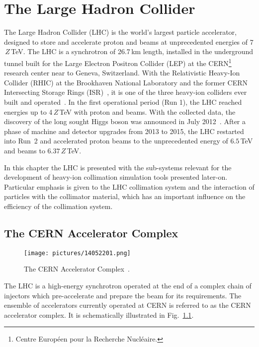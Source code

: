 \chapter{The Large Hadron Collider}\label{thelhc}
%
%
The Large Hadron Collider (\acrshort{LHC}) is the world's largest particle accelerator, designed to store and accelerate proton and \lead beams at unprecedented energies of 7$\,Z\,$TeV. The LHC is a synchrotron of 26.7\,km length, installed in the underground tunnel built for the Large Electron Positron Collider (LEP) at the CERN\footnote{Centre Europ\'{e}en pour la Recherche Nucl\'{e}aire.} research center near to Geneva, Switzerland. With the Relativistic Heavy-Ion Collider (RHIC) at the Brookhaven National Laboratory and the former CERN Intersecting Storage Rings (ISR)~\cite{ISRref}, it is one of the three heavy-ion colliders ever built and operated~\cite{Fischer2014}. In the first operational period (Run 1), the LHC reached energies up to 4$\,Z\,$TeV with proton and \lead beams. With the collected data, the discovery of the long sought Higgs boson was announced in July 2012~\cite{higgs:ATLAS,higgs:CMS}. After a phase of machine and detector upgrades from 2013 to 2015, the LHC restarted into \mbox{Run 2} and accelerated proton beams to the unprecedented energy of $6.5\,$TeV and \lead beams to $6.37\,Z\,$TeV.
%

In this chapter the LHC is presented with the sub-systems relevant for the development of heavy-ion collimation simulation tools presented later-on. Particular emphasis is given to the LHC collimation system and the interaction of particles with the collimator material, which has an important influence on the efficiency of the collimation system.

%
\section{The CERN Accelerator Complex}
%
  \begin{figure}[t]
    \centering
    \texttt{[image: pictures/14052201.png]}
    \caption{ The CERN Accelerator Complex~\cite{Christiane:1260465}.}  
    \label{pic:14052201}
  \end{figure}
%
The LHC is a high-energy synchrotron operated at the end of a complex chain of injectors which pre-accelerate and prepare the beam for its requirements. The ensemble of accelerators currently operated at CERN is referred to as the CERN accelerator complex. It is schematically illustrated in Fig.~\ref{pic:14052201}. 

